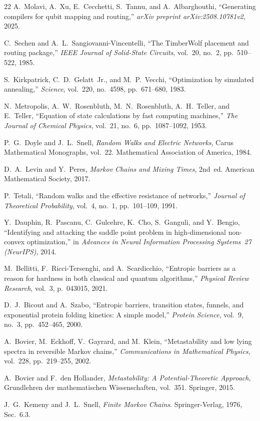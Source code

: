 \documentclass[conference]{IEEEtran}
\begin{document}
\begin{thebibliography}{22}
A.~Molavi, A.~Xu, E.~Cecchetti, S.~Tannu, and A.~Albarghouthi,
``Generating compilers for qubit mapping and routing,''
\emph{arXiv preprint arXiv:2508.10781v2}, 2025.

C.~Sechen and A.~L.~Sangiovanni-Vincentelli,
``The {TimberWolf} placement and routing package,''
\emph{IEEE Journal of Solid-State Circuits},
vol.~20, no.~2, pp.~510--522, 1985.

S.~Kirkpatrick, C.~D.~Gelatt~Jr., and M.~P.~Vecchi,
``Optimization by simulated annealing,''
\emph{Science}, vol.~220, no.~4598, pp.~671--680, 1983.

N.~Metropolis, A.~W.~Rosenbluth, M.~N.~Rosenbluth, A.~H.~Teller,
and E.~Teller,
``Equation of state calculations by fast computing machines,''
\emph{The Journal of Chemical Physics},
vol.~21, no.~6, pp.~1087--1092, 1953.

P.~G.~Doyle and J.~L.~Snell,
\emph{Random Walks and Electric Networks},
Carus Mathematical Monographs, vol.~22.
Mathematical Association of America, 1984.

D.~A.~Levin and Y.~Peres,
\emph{Markov Chains and Mixing Times}, 2nd~ed.
American Mathematical Society, 2017.

P.~Tetali,
``Random walks and the effective resistance of networks,''
\emph{Journal of Theoretical Probability},
vol.~4, no.~1, pp.~101--109, 1991.

Y.~Dauphin, R.~Pascanu, C.~Gulcehre, K.~Cho, S.~Ganguli,
and Y.~Bengio,
``Identifying and attacking the saddle point problem in
high-dimensional non-convex optimization,''
in \emph{Advances in Neural Information Processing Systems~27
(NeurIPS)}, 2014.

M.~Bellitti, F.~Ricci-Tersenghi, and A.~Scardicchio,
``Entropic barriers as a reason for hardness in both classical and
quantum algorithms,''
\emph{Physical Review Research}, vol.~3, p.~043015, 2021.

D.~J.~Bicout and A.~Szabo,
``Entropic barriers, transition states, funnels, and exponential
protein folding kinetics: A simple model,''
\emph{Protein Science}, vol.~9, no.~3, pp.~452--465, 2000.

A.~Bovier, M.~Eckhoff, V.~Gayrard, and M.~Klein,
``Metastability and low lying spectra in reversible {M}arkov chains,''
\emph{Communications in Mathematical Physics},
vol.~228, pp.~219--255, 2002.

A.~Bovier and F.~den Hollander,
\emph{Metastability: A Potential-Theoretic Approach},
Grundlehren der mathematischen Wissenschaften, vol.~351.
Springer, 2015.

J.~G.~Kemeny and J.~L.~Snell,
\emph{Finite Markov Chains}.
Springer-Verlag, 1976, Sec.~6.3.

\end{thebibliography}
\end{document}
